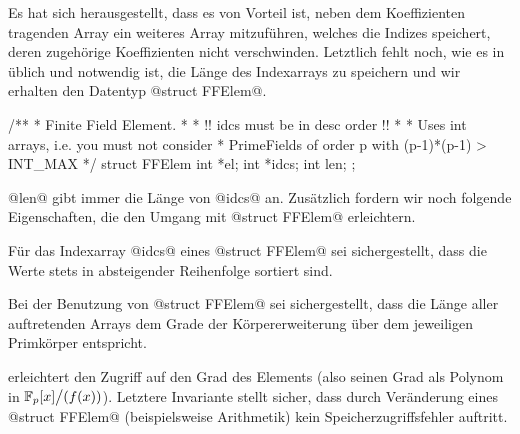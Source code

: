 Es hat sich herausgestellt, dass es von Vorteil ist, neben dem Koeffizienten
tragenden Array ein weiteres Array mitzuführen, welches die
Indizes speichert, deren zugehörige Koeffizienten nicht verschwinden. Letztlich
fehlt noch, wie es in \Clang üblich und notwendig ist, die Länge des
Indexarrays zu speichern und wir erhalten den Datentyp @struct FFElem@.

\begin{ccode}[caption={[\texttt{struct FFElem} aus 
 \url{../Sage/enumeratePCNs.c}]Aus \url{../Sage/enumeratePCNs.c}}]
/**
 * Finite Field Element. 
 * 
 * !! idcs must be in desc order !!
 *
 * Uses int arrays, i.e. you must not consider 
 * PrimeFields of order p with  (p-1)*(p-1) > INT_MAX
 */
struct FFElem{
    int *el;
    int *idcs;
    int len;
};
\end{ccode}

@len@ gibt immer die Länge von @idcs@ an. Zusätzlich fordern wir noch folgende
Eigenschaften, die den Umgang mit @struct FFElem@ erleichtern.

\begin{invariante}
  \label{invariante:desc_order}
  Für das Indexarray @idcs@ eines @struct FFElem@ sei sichergestellt, 
  dass die Werte stets in absteigender Reihenfolge sortiert sind. 
\end{invariante}

\begin{invariante}
  \label{invariante:array_len}
  Bei der Benutzung von @struct FFElem@ sei sichergestellt, 
  dass die Länge aller auftretenden Arrays dem Grade der 
  Körpererweiterung über dem jeweiligen Primkörper entspricht.
\end{invariante}

 erleichtert den Zugriff auf
den Grad des Elements (also seinen Grad als Polynom in
$\mathbb{F}_p[x]\big/(f(x))$). Letztere Invariante stellt sicher, dass durch
Veränderung eines @struct FFElem@ (beispielsweise Arithmetik) kein 
Speicherzugriffsfehler auftritt.

